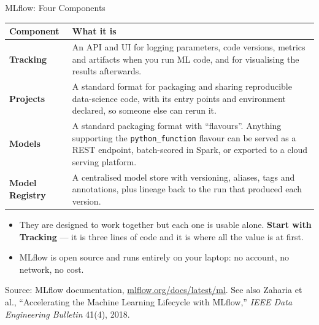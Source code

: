 
\begin{frame}{MLflow: Four Components}

    \centering
    \renewcommand{\arraystretch}{1.35}
    {\scriptsize
    \begin{tabular}{p{2.6cm}|p{9.0cm}}
        \toprule
        \textbf{Component} & \textbf{What it is} \\
        \midrule
        \textbf{Tracking}   & An API and UI for logging parameters, code versions, metrics and artifacts
                              when you run ML code, and for visualising the results afterwards. \\
        \textbf{Projects}   & A standard format for packaging and sharing reproducible data-science code,
                              with its entry points and environment declared, so someone else can rerun it. \\
        \textbf{Models}     & A standard packaging format with ``flavours''. Anything supporting the
                              \texttt{python\_function} flavour can be served as a REST endpoint, batch-scored
                              in Spark, or exported to a cloud serving platform. \\
        \textbf{Model Registry} & A centralised model store with versioning, aliases, tags and
                              annotations, plus lineage back to the run that produced each version. \\
        \bottomrule
    \end{tabular}}

    \vspace{0.24em}
    \begin{itemize}
        \scriptsize
        \item They are designed to work together but each one is usable alone. \textbf{Start with Tracking}
              --- it is three lines of code and it is where all the value is at first.
        \item MLflow is open source and runs entirely on your laptop: no account, no network, no cost.
    \end{itemize}

    \vspace{0.09em}
    {\scriptsize Source: MLflow documentation, \href{https://mlflow.org/docs/latest/ml/}{mlflow.org/docs/latest/ml}.
    See also Zaharia et al., ``Accelerating the Machine Learning Lifecycle with MLflow,''
    \textit{IEEE Data Engineering Bulletin} 41(4), 2018.}

\end{frame}
